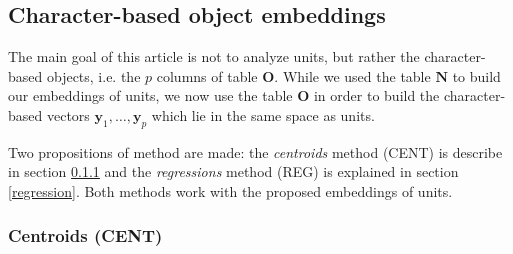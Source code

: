 \documentclass[
twocolumn,
]{ceurart}
\begin{document}
\subsection{Character-based object embeddings}

The main goal of this article is not to analyze units, but rather the character-based objects, i.e. the $p$ columns of table $\mathbf{O}$. While we used the table $\mathbf{N}$ to build our embeddings of units, we now use the table $\mathbf{O}$ in order to build the character-based vectors $\mathbf{y}_1, \ldots, \mathbf{y}_p$ which lie in the same space as units. 

Two propositions of method are made: the \emph{centroids} method (CENT) is describe in section \ref{centroid} and the \emph{regressions} method (REG) is explained in section \ref{regression}. Both methods work with the proposed embeddings of units.

\subsubsection{Centroids (CENT)}
\label{centroid}
\end{document}
